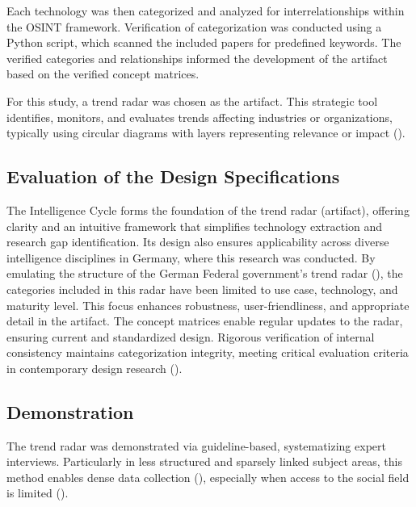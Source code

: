 \documentclass[10pt]{article}
\begin{document}

Each technology was then categorized and analyzed for interrelationships within the OSINT framework. Verification of categorization was conducted using a Python script, which scanned the included papers for predefined keywords. The verified categories and relationships informed the development of the artifact based on the verified concept matrices.

For this study, a trend radar was chosen as the artifact. This strategic tool identifies, monitors, and evaluates trends affecting industries or organizations, typically using circular diagrams with layers representing relevance or impact (\cite{wulfmettbrenn2017}).

\subsection{Evaluation of the Design Specifications}
The Intelligence Cycle forms the foundation of the trend radar (artifact), offering clarity and an intuitive framework that simplifies technology extraction and research gap identification. Its design also ensures applicability across diverse intelligence disciplines in Germany, where this research was conducted. By emulating the structure of the German Federal government's trend radar (\cite{Stich.2022}), the categories included in this radar have been limited to use case, technology, and maturity level. This focus enhances robustness, user-friendliness, and appropriate detail in the artifact. The concept matrices enable regular updates to the radar, ensuring current and standardized design. Rigorous verification of internal consistency maintains categorization integrity, meeting critical evaluation criteria in contemporary design research (\cite{vomBrocke.2020b}).


\subsection{Demonstration}
The trend radar was demonstrated via guideline-based, systematizing expert interviews. Particularly in less structured and sparsely linked subject areas, this method enables dense data collection (\cite{Meuser.1991}), especially when access to the social field is limited (\cite{Glaser.2009}).
\end{document}
